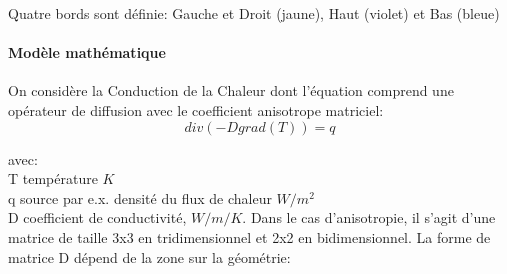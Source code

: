 \documentclass{article}
\begin{document}
	Quatre bords sont définie: Gauche et Droit (jaune), Haut (violet) et Bas (bleue)
	
	\paragraph{Modèle mathématique}
	On considère la Conduction de la Chaleur dont l'équation comprend une opérateur de diffusion avec le coefficient anisotrope matriciel:
	\begin{equation}
		div(-Dgrad(T)) = q
	\end{equation}
		
	avec:\\
	T température $K$ \\
	q source par e.x. densité du flux de chaleur $W/m^2$ \\
	D coefficient de conductivité, $W/m/K$. Dans le cas d'anisotropie, il s'agit d'une matrice de taille 3x3 en tridimensionnel et 2x2 en bidimensionnel. La forme de matrice D dépend de la zone sur la géométrie:\\
	
\end{document}
